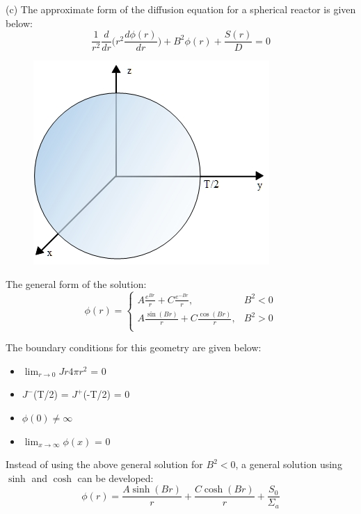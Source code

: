 \documentclass{amsart}
\theoremstyle{definition}
\begin{document}

(c) The approximate form of the diffusion equation for a spherical reactor is given below:
\bigbreak
\begin{equation*}
    \frac{1}{r^2}\frac{d}{dr}\bigg(r^2 \frac{d\phi(r)}{dr}\bigg) +B^2\phi(r) + \frac{S(r)}{D} = 0
\end{equation*}

\begin{figure}[h!]
    \includegraphics[width=.45\linewidth]{P1c}
\end{figure}
\bigbreak


The general form of the solution:
\bigbreak
\[   \phi(r) = \left\{
\begin{array}{ll}
      A\frac{e^{Br}}{r} + C\frac{e^{-Br}}{r}, &  B^2 < 0\\
      A\frac{\sin(Br)}{r} + C\frac{\cos(Br)}{r}, &  B^2 > 0\\
\end{array}
\right. \]
\bigbreak


The boundary conditions for this geometry are given below:
\begin{itemize}
    \item $\lim_{r \rightarrow 0}Jr4\pi r^2$ = 0
    \item $J^-$(T/2) = $J^+$(-T/2) = 0
    \item $\phi(0) \neq \infty$
    \item $\lim_{x\to\infty} \phi(x)$ = 0
\end{itemize}


Instead of using the above general solution for $B^2 < 0$, a general solution using $\sinh$ and $\cosh$ can be developed:
\begin{equation*}
    \phi(r) = \frac{A\sinh(Br)}{r}+\frac{C\cosh(Br)}{r}+\frac{S_0}{\Sigma_a}
\end{equation*}
\end{document}
